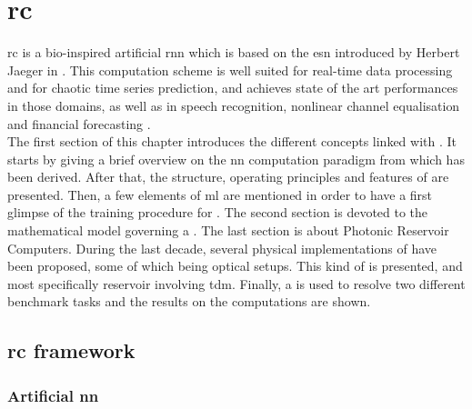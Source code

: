 \chapter{\acrlong{rc}}
\label{rc}

\gls{rc} is a bio-inspired artificial \gls{rnn} which is based on the \gls{esn} introduced by Herbert Jaeger in \cite{Jaeger2004}. This computation scheme is well suited for real-time data processing and for chaotic time series prediction\cite{Jaeger2004, JaegerH.2001Tesa, Lukoeviius2012}, and achieves state of the art performances in those domains, as well as in speech recognition\cite{Verstraeten2006, NIPS2010_4056, Jaeger2007}, nonlinear channel equalisation\cite{Jaeger2004} and financial forecasting \cite{financialTimeSeries}.\\

The first section of this chapter introduces the different concepts linked with \rc. It starts by giving a brief overview on the \gls{nn} computation paradigm from which \rc has been derived. After that, the structure, operating principles and features of \rcer are presented. Then, a few elements of \gls{ml} are mentioned in order to have a first glimpse of the training procedure for \rcer. The second section is devoted to the mathematical model governing a \rcer. The last section is about Photonic Reservoir Computers. During the last decade, several physical implementations of \rcer have been proposed, some of which being optical setups. This kind of \rcer is presented, and most specifically reservoir involving \gls{tdm}. Finally, a \rcer is used to resolve two different benchmark tasks and the results on the computations are shown.

\section{\acrlong{rc} framework}


\subsection{Artificial \acrlong{nn}}

